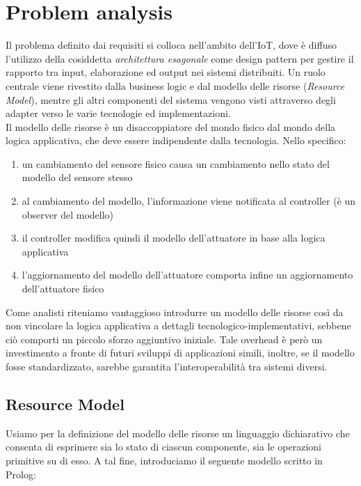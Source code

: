 \documentclass{../llncs}
\newcommand{\labelsec}[1]{\label{sec:#1}}
\begin{document}
\section{Problem analysis}
\labelsec{ProblemAnalysis}
Il problema definito dai requisiti si colloca nell'ambito dell'IoT, dove è diffuso l'utilizzo della cosiddetta \emph{architettura esagonale} come design pattern per gestire il rapporto tra input, elaborazione ed output nei sistemi distribuiti. Un ruolo centrale viene rivestito dalla business logic e dal modello delle risorse (\emph{Resource Model}), mentre gli altri componenti del sistema vengono visti attraverso degli adapter verso le varie tecnologie ed implementazioni.\\

Il modello delle risorse è un disaccoppiatore del mondo fisico dal mondo della logica applicativa, che deve essere indipendente dalla tecnologia. Nello specifico:
\begin{enumerate}
\item un cambiamento del sensore fisico causa un cambiamento nello stato del modello del sensore stesso
\item al cambiamento del modello, l'informazione viene notificata al controller (è un observer del modello)
\item il controller modifica quindi il modello dell'attuatore in base alla logica applicativa
\item l'aggiornamento del modello dell'attuatore comporta infine un aggiornamento dell'attuatore fisico
\end{enumerate}

Come analisti riteniamo vantaggioso introdurre un modello delle risorse così da non vincolare la logica applicativa a dettagli tecnologico-implementativi, sebbene ciò comporti un piccolo sforzo aggiuntivo iniziale. Tale overhead è però un investimento a fronte di futuri sviluppi di applicazioni simili, inoltre, se il modello fosse standardizzato, sarebbe garantita l'interoperabilità tra sistemi diversi.

\subsection{Resource Model}
Usiamo per la definizione del modello delle risorse un linguaggio dichiarativo che consenta di esprimere sia lo stato di ciascun componente, sia le operazioni primitive su di esso. A tal fine, introduciamo il seguente modello scritto in Prolog:\\
\end{document}
